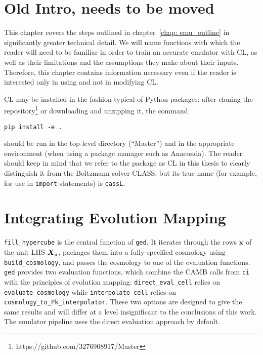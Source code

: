 \section{Old Intro, needs to be moved}

This chapter covers the steps outlined in chapter~\ref{chap: emu_outline} in
significantly greater technical detail. We will name functions with which the
reader will need to be familiar in order to train an accurate emulator with
CL, as well as their limitations and the assumptions they make about their
inputs. Therefore, this chapter contains information necessary even if the
reader is interested only in using and not in modifying CL.

CL may be installed in the fashion typical of Python packages: after cloning
the repository\footnote{https://github.com/3276908917/Master}
or downloading and unzipping it, the command

\verb|pip install -e .|

should be run in the top-level directory (``Master'') and in the
appropriate environment (when using a package manager such as Anaconda).
The reader should keep in mind that we refer to the package as CL in this
thesis to clearly distinguish it from the Boltzmann solver CLASS, but its
true name (for example, for use in \texttt{import} statements) is
\texttt{cassL}.

\section{Integrating Evolution Mapping}
\label{sec: generate_emu_data}



\verb|fill_hypercube| is the central function of \texttt{ged}. It iterates 
through the rows $\bm{x}$ of the unit LHS
$\bm{X}_u$, packages them into a fully-specified cosmology using
\verb|build_cosmology|, and passes the cosmology to one of the 
evaluation functions. \texttt{ged} provides two evaluation functions, which 
combine the CAMB calls from \texttt{ci} with the
principles of evolution mapping: \verb|direct_eval_cell| relies on
\verb|evaluate_cosmology| while \verb|interpolate_cell| relies on
\verb|cosmology_to_Pk_interpolator|. These two options are designed to give
the same results and will differ at a level insignificant to the conclusions
of this work. The emulator pipeline uses the direct evaluation approach by
default.

